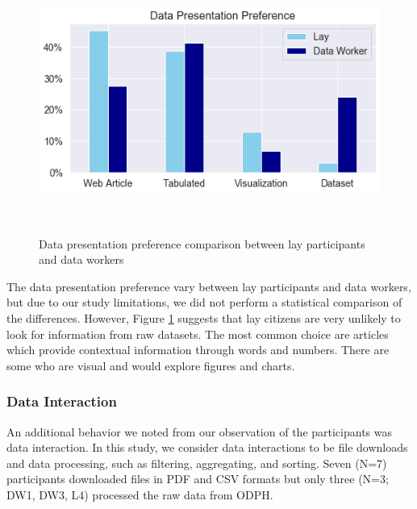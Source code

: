 \documentclass{sigchi}
\begin{document}
\begin{figure}[tp]
\centering
 \includegraphics[width=0.9\columnwidth]{figures/datapresentation.png}
 \caption{Data presentation preference comparison between lay participants and data workers}~\label{fig:datapresentation}
\end{figure}

The data presentation preference vary between lay participants and data workers, but due to our study limitations, we did not perform a statistical comparison of the differences. However, Figure \ref{fig:datapresentation} suggests that lay citizens are very unlikely to look for information from raw datasets. The most common choice are articles which provide contextual information through words and numbers. There are some who are visual and would explore figures and charts.


\subsubsection{Data Interaction}
An additional behavior we noted from our observation of the participants was data interaction. In this study, we consider data interactions to be file downloads and data processing, such as filtering, aggregating, and sorting. Seven (N=7) participants downloaded files in PDF and CSV formats but only three (N=3; DW1, DW3, L4) processed the raw data from ODPH.
\end{document}
